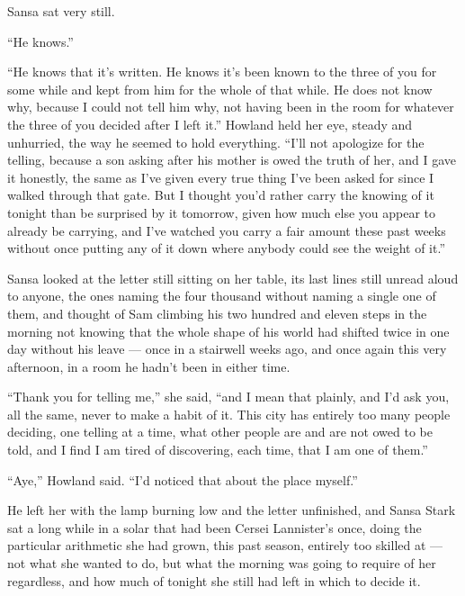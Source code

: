 Sansa sat very still.

“He knows.”

“He knows that it’s written. He knows it’s been known to the three of you for some while and kept from him for the whole of that while. He does not know why, because I could not tell him why, not having been in the room for whatever the three of you decided after I left it.” Howland held her eye, steady and unhurried, the way he seemed to hold everything. “I’ll not apologize for the telling, because a son asking after his mother is owed the truth of her, and I gave it honestly, the same as I’ve given every true thing I’ve been asked for since I walked through that gate. But I thought you’d rather carry the knowing of it tonight than be surprised by it tomorrow, given how much else you appear to already be carrying, and I’ve watched you carry a fair amount these past weeks without once putting any of it down where anybody could see the weight of it.”

Sansa looked at the letter still sitting on her table, its last lines still unread aloud to anyone, the ones naming the four thousand without naming a single one of them, and thought of Sam climbing his two hundred and eleven steps in the morning not knowing that the whole shape of his world had shifted twice in one day without his leave — once in a stairwell weeks ago, and once again this very afternoon, in a room he hadn’t been in either time.

“Thank you for telling me,” she said, “and I mean that plainly, and I’d ask you, all the same, never to make a habit of it. This city has entirely too many people deciding, one telling at a time, what other people are and are not owed to be told, and I find I am tired of discovering, each time, that I am one of them.”

“Aye,” Howland said. “I’d noticed that about the place myself.”

He left her with the lamp burning low and the letter unfinished, and Sansa Stark sat a long while in a solar that had been Cersei Lannister’s once, doing the particular arithmetic she had grown, this past season, entirely too skilled at — not what she wanted to do, but what the morning was going to require of her regardless, and how much of tonight she still had left in which to decide it.